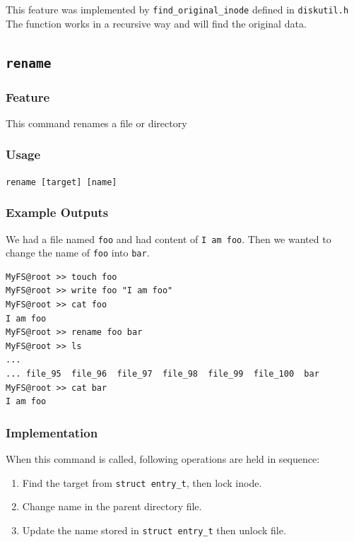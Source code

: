 \documentclass{homework}
\begin{document}
This feature was implemented by \texttt{find_original_inode} defined in \texttt{diskutil.h} The function works in a recursive way and will find the original data. 
\pagebreak

\subsection{\texttt{rename}}
\subsubsection{Feature}
This command renames a file or directory
\subsubsection{Usage}
\begin{center}
\texttt{rename [target] [name]}
\end{center}
\subsubsection{Example Outputs}
We had a file named \texttt{foo} and had content of \texttt{I am foo}. Then we wanted to change the name of \texttt{foo} into \texttt{bar}.
\\
\begin{center}
\begin{code}
\begin{verbatim}
MyFS@root >> touch foo
MyFS@root >> write foo "I am foo"
MyFS@root >> cat foo
I am foo
MyFS@root >> rename foo bar
MyFS@root >> ls
...
... file_95  file_96  file_97  file_98  file_99  file_100  bar
MyFS@root >> cat bar
I am foo
\end{verbatim}
\end{code}
\end{center}

\subsubsection{Implementation}
When this command is called, following operations are held in sequence:
\begin{enumerate}
    \item Find the target from \texttt{struct entry_t}, then lock inode.
    \item Change name in the parent directory file.
    \item Update the name stored in \texttt{struct entry_t} then unlock file.
\end{enumerate}
\end{document}

